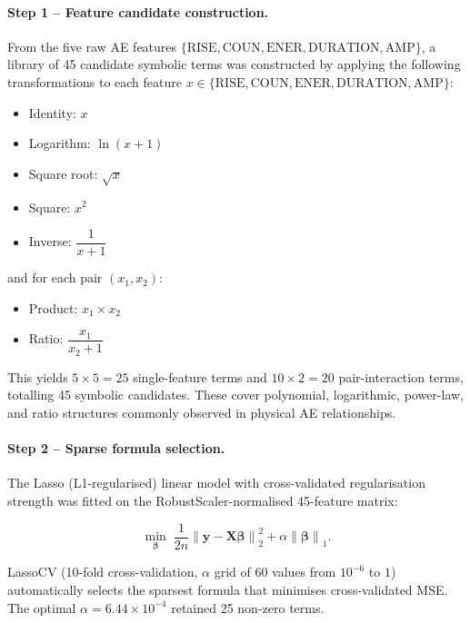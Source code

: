 \documentclass[12pt,a4paper]{article}
\begin{document}
\paragraph{Step 1 -- Feature candidate construction.}
From the five raw AE features $\{\text{RISE}, \text{COUN}, \text{ENER},
\text{DURATION}, \text{AMP}\}$, a library of 45 candidate symbolic terms was
constructed by applying the following transformations to each feature
$x \in \{\text{RISE}, \text{COUN}, \text{ENER}, \text{DURATION}, \text{AMP}\}$:

\begin{itemize}
  \item Identity: $x$
  \item Logarithm: $\ln(x + 1)$
  \item Square root: $\sqrt{x}$
  \item Square: $x^{2}$
  \item Inverse: $\dfrac{1}{x + 1}$
\end{itemize}

and for each pair $(x_1, x_2)$:

\begin{itemize}
  \item Product: $x_1 \times x_2$
  \item Ratio: $\dfrac{x_1}{x_2 + 1}$
\end{itemize}

This yields $5 \times 5 = 25$ single-feature terms and $10 \times 2 = 20$
pair-interaction terms, totalling 45 symbolic candidates. These cover
polynomial, logarithmic, power-law, and ratio structures commonly observed in
physical AE relationships.

\paragraph{Step 2 -- Sparse formula selection.}
The Lasso (L1-regularised) linear model with cross-validated regularisation
strength was fitted on the RobustScaler-normalised 45-feature matrix:

\begin{equation}
  \label{eq:lasso}
  \min_{\boldsymbol{\beta}}\; \frac{1}{2n}
    \left\|\mathbf{y} - \mathbf{X}\boldsymbol{\beta}\right\|^{2}_{2}
  + \alpha\left\|\boldsymbol{\beta}\right\|_{1}.
\end{equation}

LassoCV (10-fold cross-validation, $\alpha$ grid of 60 values from $10^{-6}$
to $1$) automatically selects the sparsest formula that minimises cross-validated
MSE. The optimal $\alpha = 6.44 \times 10^{-4}$ retained 25 non-zero terms.
\end{document}
